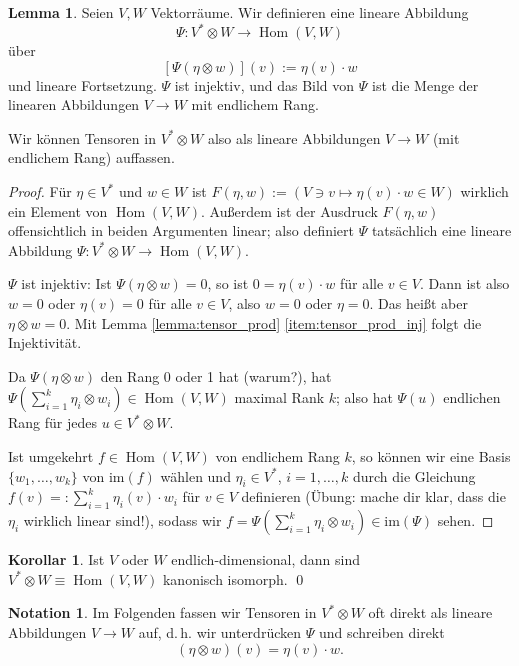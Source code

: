 \documentclass[a4paper]{scrreprt}
\numberwithin{equation}{chapter}
\DeclareMathOperator{\Hom}{Hom}
\theoremstyle{definition}
\newtheorem{lemma}[defn]{Lemma}
\newtheorem{kor}[defn]{Korollar}
\newtheorem{nota}[defn]{Notation}
\begin{document}
\begin{lemma}
	Seien $V,W$ Vektorräume. Wir definieren eine lineare Abbildung
	\[\Psi\colon V^*\otimes W \to \Hom(V,W)\]
	über
	\[[\Psi(\eta\otimes w)](v) := \eta(v) \cdot w\]
	und lineare Fortsetzung. $\Psi$ ist injektiv, und das Bild von $\Psi$ ist die Menge der linearen Abbildungen $V\to W$ mit endlichem Rang.

	Wir können Tensoren in $V^*\otimes W$ also als lineare Abbildungen $V\to W$ (mit endlichem Rang) auffassen.

	\begin{proof}
		Für $\eta \in V^*$ und $w\in W$ ist $F(\eta,w) := (V \ni v \mapsto \eta(v) \cdot w \in W)$ wirklich ein Element von $\Hom(V,W)$. Außerdem ist der Ausdruck $F(\eta,w)$ offensichtlich in beiden Argumenten linear; also definiert $\Psi$ tatsächlich eine lineare Abbildung $\Psi\colon V^*\otimes W \to \Hom(V,W)$.

		$\Psi$ ist injektiv: Ist $\Psi(\eta \otimes w) = 0$, so ist $0 = \eta(v) \cdot w$ für alle $v\in V$. Dann ist also $w=0$ oder $\eta(v) = 0$ für alle $v\in V$, also $w=0$ oder $\eta=0$. Das heißt aber $\eta \otimes w = 0$. Mit Lemma \ref{lemma:tensor_prod} \ref{item:tensor_prod_inj} folgt die Injektivität.

		Da $\Psi(\eta\otimes w)$ den Rang 0 oder 1 hat (warum?), hat $\Psi\left(\sum_{i=1}^k \eta_i \otimes w_i\right) \in \Hom(V,W)$ maximal Rank $k$; also hat $\Psi(u)$ endlichen Rang für jedes $u\in V^*\otimes W$.

		Ist umgekehrt $f\in\Hom(V,W)$ von endlichem Rang $k$, so können wir eine Basis $\{w_1,\dots,w_k\}$ von $\mathrm{im}(f)$ wählen und $\eta_i \in V^*$, $i=1,\dots,k$ durch die Gleichung $f(v) =: \sum_{i=1}^k \eta_i(v) \cdot w_i$ für $v\in V$ definieren (Übung: mache dir klar, dass die $\eta_i$ wirklich linear sind!), sodass wir $f = \Psi\left(\sum_{i=1}^k \eta_i \otimes w_i\right) \in \mathrm{im}(\Psi)$ sehen.
	\end{proof}
\end{lemma}
\begin{kor}
	Ist $V$ oder $W$ endlich-dimensional, dann sind $V^* \otimes W \equiv \Hom(V,W)$ kanonisch isomorph. \qed
\end{kor}
\begin{nota}
	Im Folgenden fassen wir Tensoren in $V^* \otimes W$ oft direkt als lineare Abbildungen $V\to W$ auf, d.\,h. wir unterdrücken $\Psi$ und schreiben direkt
\[(\eta\otimes w)(v) = \eta(v) \cdot w.\]
\end{nota}
\end{document}
